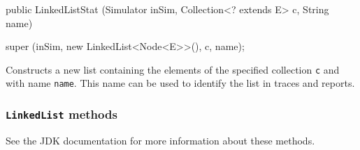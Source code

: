 \begin{code}

   public LinkedListStat (Simulator inSim, Collection<? extends E> c,
                          String name)\begin{hide} {
      super (inSim, new LinkedList<Node<E>>(), c, name);
   }\end{hide}
\end{code}
\begin{tabb} Constructs a new list containing the elements of the
   specified collection \texttt{c} and with name \texttt{name}.
   This name can be used to identify the list in traces and reports.
\end{tabb}
\begin{htmlonly}
\end{htmlonly}

\subsubsection* {\texttt{LinkedList} methods}

See the JDK documentation for more information about these methods.

